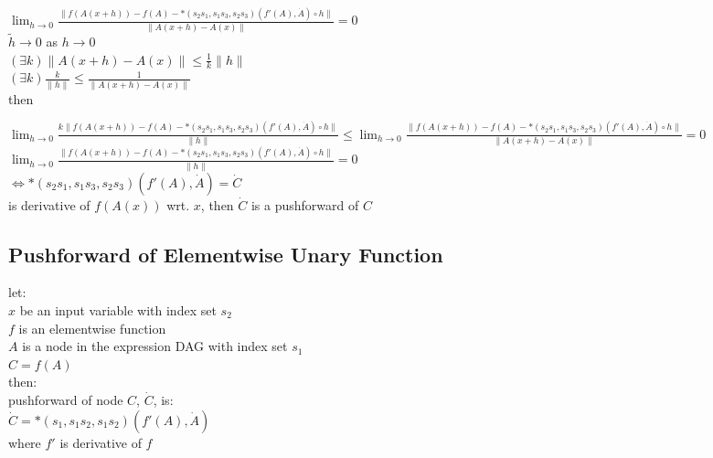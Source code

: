 \documentclass[8pt]{extarticle}
\begin{document}
\begin{multicols*}{2}
  $\lim_{h \rightarrow 0} \frac{\| f(A(x+h)) - f(A) - *(s_2 s_1, s_1 s_3, s_2 s_3)(f'(A), \dot{A}) \circ h \|}{\| A(x+h) - A(x) \|} = 0$\\

  $\tilde{h} \rightarrow 0$ as $h \rightarrow 0$\\
  $(\exists k) \| A(x+h) - A(x) \| \leq \frac{1}{k} \| h \|$\\
  $(\exists k) \frac{k}{\|h\|} \leq \frac{1}{\| A(x+h) - A(x) \|}$\\
  then

  $\lim_{h \rightarrow 0} \frac{ k \| f(A(x+h)) - f(A) - *(s_2 s_1, s_1 s_3, s_2 s_3)(f'(A), \dot{A}) \circ h \|}{\|h\|} \leq \lim_{h\rightarrow 0} \frac{\| f(A(x+h)) - f(A) - *(s_2 s_1, s_1 s_3, s_2 s_3)(f'(A), \dot{A}) \circ h \|}{\|A(x+h) - A(x)\|} = 0$\\

  $\lim_{h \rightarrow 0} \frac{\| f(A(x+h)) - f(A) - *(s_2 s_1, s_1 s_3, s_2 s_3)(f'(A), \dot{A}) \circ h \|}{\|h\|} = 0$ \\
  $\iff *(s_2 s_1, s_1 s_3, s_2 s_3)(f'(A), \dot{A}) = \dot{C}$ \\
  is derivative of $f(A(x))$ wrt. $x$, then $\dot{C}$ is a pushforward of $C$
  
  \vfill\null
  \columnbreak

  \subsection{Pushforward of Elementwise Unary Function}
  let:\\
  $x$ be an input variable with index set $s_2$\\
  $f$ is an elementwise function\\
  $A$ is a node in the expression DAG with index set $s_1$\\
  $C=f(A)$\\
  then:\\
  pushforward of node $C$, $\dot{C}$, is:\\
  $\dot{C} = *(s_1, s_1 s_2, s_1 s_2)(f'(A), \dot{A})$\\
  where $f'$ is derivative of $f$


\end{multicols*}
\end{document}
